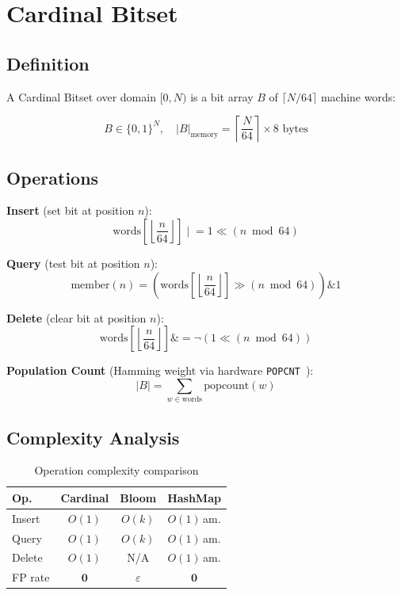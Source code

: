 \documentclass[11pt,twocolumn]{article}
\begin{document}
\section{Cardinal Bitset}

\subsection{Definition}

A Cardinal Bitset over domain $[0, N)$ is a bit array $B$ of $\lceil N/64 \rceil$ machine words:

\begin{equation}
B \in \{0, 1\}^N, \quad |B|_{\text{memory}} = \left\lceil \frac{N}{64} \right\rceil \times 8 \text{ bytes}
\end{equation}

\subsection{Operations}

\textbf{Insert} (set bit at position $n$):
\begin{equation}
\text{words}\!\left[\left\lfloor \frac{n}{64} \right\rfloor\right] \mathrel{|}= 1 \ll (n \bmod 64)
\end{equation}

\textbf{Query} (test bit at position $n$):
\begin{equation}
\text{member}(n) = \left(\text{words}\!\left[\left\lfloor \frac{n}{64} \right\rfloor\right] \gg (n \bmod 64)\right) \mathbin{\&} 1
\end{equation}

\textbf{Delete} (clear bit at position $n$):
\begin{equation}
\text{words}\!\left[\left\lfloor \frac{n}{64} \right\rfloor\right] \mathrel{\&}= \lnot(1 \ll (n \bmod 64))
\end{equation}

\textbf{Population Count} (Hamming weight via hardware \texttt{POPCNT}~\cite{knuth2011}):
\begin{equation}
|B| = \sum_{w \in \text{words}} \text{popcount}(w)
\end{equation}

\subsection{Complexity Analysis}

\begin{table}[h]
\centering
\caption{Operation complexity comparison}
\label{tab:complexity}
\scriptsize
\begin{tabular}{@{}lccc@{}}
\toprule
Op. & Cardinal & Bloom & HashMap \\
\midrule
Insert & $O(1)$ & $O(k)$ & $O(1)$\,am. \\
Query & $O(1)$ & $O(k)$ & $O(1)$\,am. \\
Delete & $O(1)$ & N/A & $O(1)$\,am. \\
FP rate & $\mathbf{0}$ & $\varepsilon$ & $\mathbf{0}$ \\
\bottomrule
\end{tabular}
\end{table}
\end{document}
